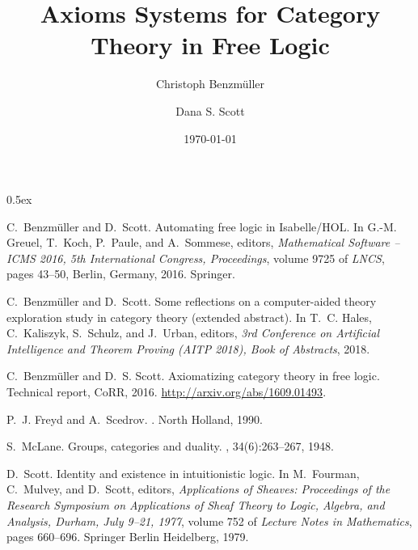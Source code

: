 \documentclass[11pt,a4paper]{article}
\begin{document}
\title{Axioms Systems for Category Theory in Free Logic}
\author[1]{Christoph Benzm\"uller}
\author[2]{Dana S. Scott}
\date{\today}                     %
\setcounter{Maxaffil}{0}
\renewcommand\Affilfont{\itshape\small}

\maketitle

\tableofcontents

\parindent 0pt\parskip 0.5ex




% 

\begin{thebibliography}{1}

C.~Benzm{\"u}ller and D.~Scott.
\newblock Automating free logic in {Isabelle/HOL}.
\newblock In G.-M. Greuel, T.~Koch, P.~Paule, and A.~Sommese, editors, {\em
  Mathematical Software -- ICMS 2016, 5th International Congress, Proceedings},
  volume 9725 of {\em LNCS}, pages 43--50, Berlin, Germany, 2016. Springer.

C.~Benzm{\"u}ller and D.~Scott.
\newblock Some reflections on a computer-aided theory exploration study in
  category theory (extended abstract).
\newblock In T.~C. Hales, C.~Kaliszyk, S.~Schulz, and J.~Urban, editors, {\em
  3rd Conference on Artificial Intelligence and Theorem Proving (AITP 2018),
  Book of Abstracts}, 2018.

C.~Benzm{\"u}ller and D.~S. Scott.
\newblock Axiomatizing category theory in free logic.
\newblock Technical report, CoRR, 2016.
\newblock \url{http://arxiv.org/abs/1609.01493}.

P.~J. Freyd and A.~Scedrov.
.
\newblock North Holland, 1990.

S.~McLane.
\newblock Groups, categories and duality.
,
  34(6):263--267, 1948.

D.~Scott.
\newblock Identity and existence in intuitionistic logic.
\newblock In M.~Fourman, C.~Mulvey, and D.~Scott, editors, {\em Applications of
  Sheaves: Proceedings of the Research Symposium on Applications of Sheaf
  Theory to Logic, Algebra, and Analysis, Durham, July 9--21, 1977}, volume 752
  of {\em Lecture Notes in Mathematics}, pages 660--696. Springer Berlin
  Heidelberg, 1979.

\end{thebibliography}
\end{document}
